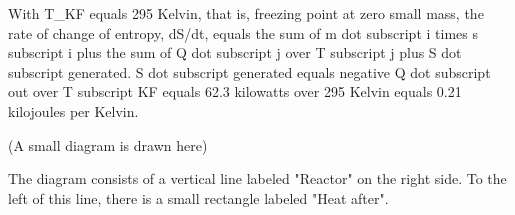 With T_KF equals 295 Kelvin,
that is, freezing point at zero small mass,
the rate of change of entropy, dS/dt, equals the sum of m dot subscript i times s subscript i plus the sum of Q dot subscript j over T subscript j plus S dot subscript generated.
S dot subscript generated equals negative Q dot subscript out over T subscript KF equals 62.3 kilowatts over 295 Kelvin equals 0.21 kilojoules per Kelvin.

(A small diagram is drawn here)

The diagram consists of a vertical line labeled "Reactor" on the right side. To the left of this line, there is a small rectangle labeled "Heat after".